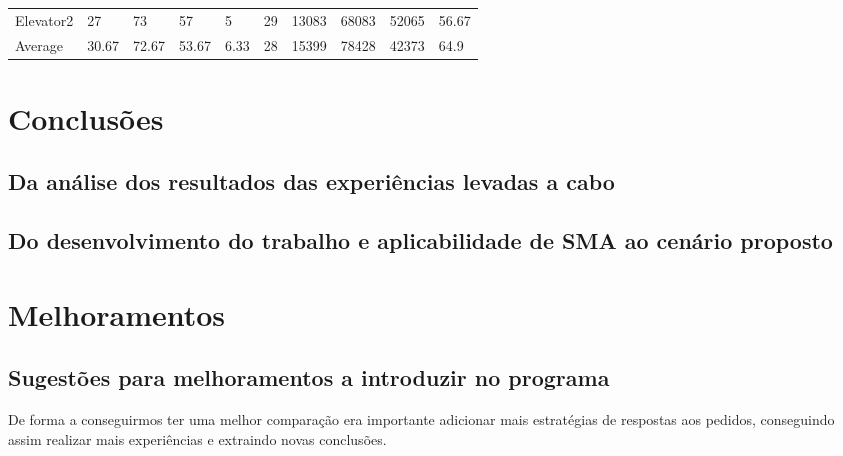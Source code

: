 \documentclass[a4paper]{article}
\begin{document}
\begin{table}[h]
\begin{tabular}{@{}llllllllll@{}}
Elevator2 & 27        & 73            & 57           & 5                                                               & 29                                                                  & 13083                                                         & 68083                                                 & 52065                                                   & 56.67         \\
Average   & 30.67     & 72.67         & 53.67        & 6.33                                                            & 28                                                               & 15399                                                         & 78428                                                 & 42373                                                   &  64.9         \\ \bottomrule
\end{tabular}
\end{table}

\newpage

\section{Conclusões}

\subsection{Da análise dos resultados das experiências levadas a cabo} 

\subsection{Do desenvolvimento do trabalho e aplicabilidade de SMA ao cenário proposto}

\newpage

\section{Melhoramentos}

\subsection{Sugestões para melhoramentos a introduzir no programa}

De forma a conseguirmos ter uma melhor comparação era importante adicionar mais estratégias de respostas aos pedidos, conseguindo assim realizar mais experiências e extraindo novas conclusões.
\end{document}
